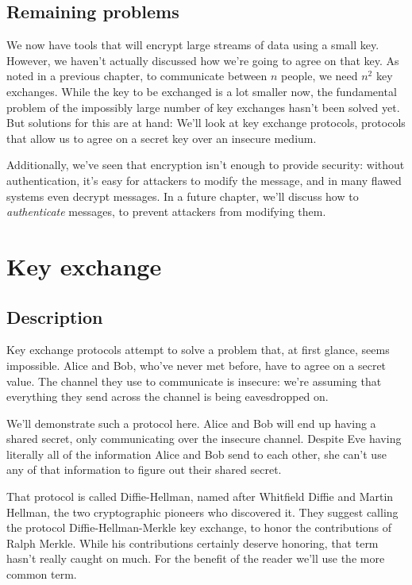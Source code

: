 \documentclass[11pt,ebook,table,dvipsnames]{memoir}
\begin{document}
\section{Remaining problems}
\label{sec-2-3-17}

We now have tools that will encrypt large streams of data using a
small key. However, we haven't actually discussed how we're going to
agree on that key. As noted in a previous chapter, to communicate
between $n$ people, we need $n^2$ key exchanges. While the key to be
exchanged is a lot smaller now, the fundamental problem of the
impossibly large number of key exchanges hasn't been solved yet. 
But solutions for this are at hand: We'll look at key exchange protocols, 
protocols that allow us to agree on a secret key over an insecure medium.

Additionally, we've seen that encryption isn't enough to provide
security: without authentication, it's easy for attackers to modify
the message, and in many flawed systems even decrypt messages. In a
future chapter, we'll discuss how to \emph{authenticate} messages, to
prevent attackers from modifying them.
\chapter{Key exchange}
\label{sec-2-4}
\section{Description}
\label{sec-2-4-1}

Key exchange protocols attempt to solve a problem that, at first
glance, seems impossible. Alice and Bob, who've never met before, have
to agree on a secret value. The channel they use to communicate is
insecure: we're assuming that everything they send across the channel
is being eavesdropped on.

We'll demonstrate such a protocol here. Alice and Bob will end up
having a shared secret, only communicating over the insecure channel.
Despite Eve having literally all of the information Alice and Bob send
to each other, she can't use any of that information to figure out
their shared secret.

That protocol is called Diffie-Hellman, named after Whitfield Diffie
and Martin Hellman, the two cryptographic pioneers who discovered it.
They suggest calling the protocol Diffie-Hellman-Merkle key exchange,
to honor the contributions of Ralph Merkle. While his contributions
certainly deserve honoring, that term hasn't really caught on much.
For the benefit of the reader we'll use the more common term.
\end{document}
